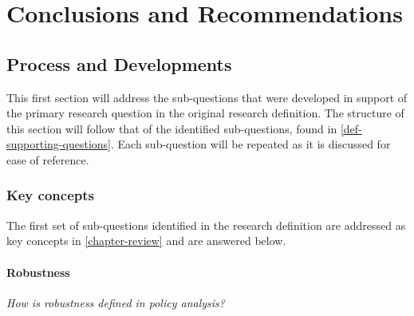 \chapter{Conclusions and Recommendations}
\label{chapter-conclusion}

\begin{abstract}
This study has, until now, involved three phases: 1) A review and development of key concepts, 2) A guide to the specification of three key robust decision support methods and three variations of the highly stylized lake problem, and 3) a conversation about the results of each method and model pairing and a comparison between pairings. In the first part of this final stage of the IMRAD structure, the key developments of this study will be discussed. Information from the first stages of this study will then be leveraged to answer the primary research question. 

\begin{researchquestion}{Research Question}
    What are the trade-offs between different methods of decision support when considering a wicked problems and varying policy implementation structures?
\end{researchquestion}

\end{abstract}

\newpage

\section{Process and Developments}
This first section will address the sub-questions that were developed in support of the primary research question in the original research definition. The structure of this section will follow that of the identified sub-questions, found in \cref{def-supporting-questions}. Each sub-question will be repeated as it is discussed for ease of reference. 

    \subsection{Key concepts}
    The first set of sub-questions identified in the research definition are addressed as key concepts in \cref{chapter-review} and are answered below. 
        
        \subsubsection{Robustness}
        \textit{How is robustness defined in policy analysis? }
        

